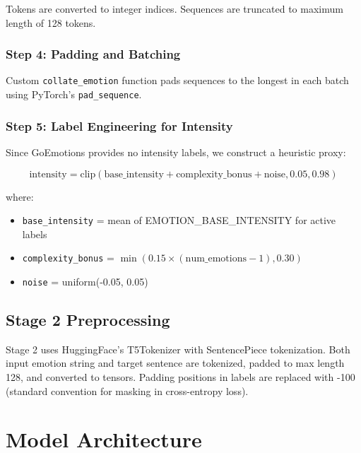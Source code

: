 \documentclass[12pt, a4paper]{report}
\begin{document}
Tokens are converted to integer indices. Sequences are truncated to maximum length of 128 tokens.

\subsection{Step 4: Padding and Batching}

Custom \texttt{collate\_emotion} function pads sequences to the longest in each batch using PyTorch's \texttt{pad\_sequence}.

\subsection{Step 5: Label Engineering for Intensity}

Since GoEmotions provides no intensity labels, we construct a heuristic proxy:

\begin{equation}
    \text{intensity} = \text{clip}(\text{base\_intensity} + \text{complexity\_bonus} + \text{noise}, 0.05, 0.98)
\end{equation}

where:
\begin{itemize}
    \item \texttt{base\_intensity} = mean of EMOTION\_BASE\_INTENSITY for active labels
    \item \texttt{complexity\_bonus} = $\min(0.15 \times (\text{num\_emotions} - 1), 0.30)$
    \item \texttt{noise} = uniform(-0.05, 0.05)
\end{itemize}

\section{Stage 2 Preprocessing}

Stage 2 uses HuggingFace's T5Tokenizer with SentencePiece tokenization. Both input emotion string and target sentence are tokenized, padded to max length 128, and converted to tensors. Padding positions in labels are replaced with -100 (standard convention for masking in cross-entropy loss).

\chapter{Model Architecture}
\end{document}
